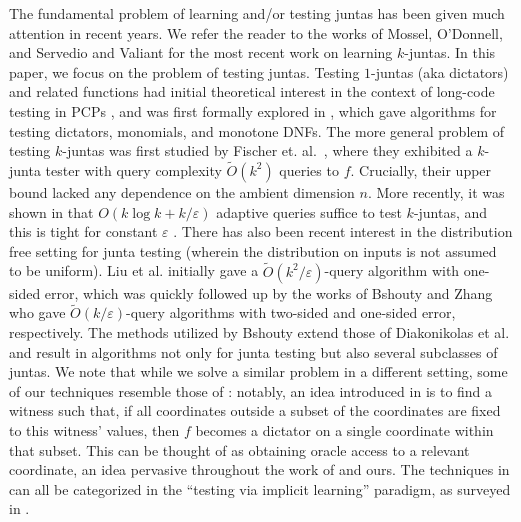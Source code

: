 \documentclass[10pt,a4paper]{article}
\theoremstyle{plain}
\theoremstyle{remark}
\theoremstyle{plain}
\newcommand{\eps}{\varepsilon}
\renewcommand{\tilde}{\widetilde}
\renewcommand{\epsilon}{\varepsilon}
\begin{document}
The fundamental problem of learning and/or testing juntas has been given much attention in recent years. We refer the reader to the works of Mossel, O'Donnell, and Servedio \cite{learning-juntas-MOS} and Valiant \cite{Valiant-learning-juntas} for the most recent work on learning $k$-juntas. 
In this paper, we focus on the problem of testing juntas. Testing $1$-juntas (aka dictators) and related functions had initial theoretical interest in the context of long-code testing in PCPs \cite{hastad-inapproximability, BellareGS98}, and was first formally explored in \cite{ParnasRS01}, which gave algorithms for testing dictators, monomials, and monotone DNFs. 
The more general problem of testing $k$-juntas was first studied by Fischer et. al.~\cite{FischerKRSS04}, where they exhibited a $k$-junta tester with query complexity $\tilde{O}(k^2)$ queries to $f$. Crucially, their upper bound lacked any dependence on the ambient dimension $n$. 
More recently, it was shown in \cite{og-junta-testing} that $O(k \log k + k/\epsilon)$ adaptive queries suffice to test $k$-juntas, and this is tight for constant $\epsilon$ \cite{saglam18-juntatestlb, DBLP:journals/ipl/ChocklerG04}. 
There has also been recent interest in the distribution free setting for junta testing (wherein the distribution on inputs is not assumed to be uniform). 
Liu et al. \cite{DBLP:journals/talg/LiuCSSX19-dist-free} initially gave a $\tilde{O}(k^2/\eps)$-query algorithm with one-sided error, which was quickly followed up by the works of Bshouty \cite{DBLP:conf/coco/Bshouty19} and Zhang \cite{DBLP:zhang-dist-free-mab-2019} who gave $\tilde{O}(k/\eps)$-query algorithms with two-sided and one-sided error, respectively. 
The methods utilized by Bshouty extend those of Diakonikolas et al. \cite{DBLP:conf/focs/DiakonikolasLMORSW07} and result in algorithms not only for junta testing but also several subclasses of juntas. We note that while we solve a similar problem in a different setting, some of our techniques resemble those of \cite{DBLP:conf/coco/Bshouty19}: notably, an idea introduced in \cite{DBLP:conf/coco/Bshouty19} is to find a witness such that, if all coordinates outside a subset of the coordinates are fixed to this witness' values, then $f$ becomes a dictator on a single coordinate within that subset. This can be thought of as obtaining oracle access to a relevant coordinate, an idea pervasive throughout the work of \cite{junta-coordinate-oracles} and ours. The techniques in \cite{DBLP:conf/focs/DiakonikolasLMORSW07, DBLP:conf/icalp/DiakonikolasLMSW08, DBLP:conf/coco/Bshouty19} can all be categorized in the ``testing via implicit learning'' paradigm, as surveyed in \cite{DBLP:conf/propertytesting/Servedio10}.  
%
\end{document}
